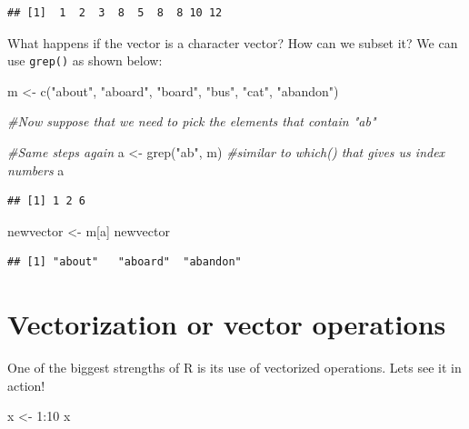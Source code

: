 \documentclass[
]{book}
\newenvironment{Shaded}{\begin{snugshade}}{\end{snugshade}}
\newcommand{\CommentTok}[1]{\textcolor[rgb]{0.56,0.35,0.01}{\textit{#1}}}
\newcommand{\DecValTok}[1]{\textcolor[rgb]{0.00,0.00,0.81}{#1}}
\newcommand{\FunctionTok}[1]{\textcolor[rgb]{0.00,0.00,0.00}{#1}}
\newcommand{\NormalTok}[1]{#1}
\newcommand{\OtherTok}[1]{\textcolor[rgb]{0.56,0.35,0.01}{#1}}
\newcommand{\SpecialCharTok}[1]{\textcolor[rgb]{0.00,0.00,0.00}{#1}}
\newcommand{\StringTok}[1]{\textcolor[rgb]{0.31,0.60,0.02}{#1}}
\theoremstyle{definition}
\theoremstyle{definition}
\theoremstyle{definition}
\theoremstyle{definition}
\theoremstyle{remark}
\begin{document}
\begin{verbatim}
## [1]  1  2  3  8  5  8  8 10 12
\end{verbatim}

What happens if the vector is a character vector? How can we subset it? We can use \texttt{grep()} as shown below:

\begin{Shaded}
\begin{Highlighting}[]
\NormalTok{m }\OtherTok{\textless{}{-}} \FunctionTok{c}\NormalTok{(}\StringTok{"about"}\NormalTok{, }\StringTok{"aboard"}\NormalTok{, }\StringTok{"board"}\NormalTok{, }\StringTok{"bus"}\NormalTok{, }\StringTok{"cat"}\NormalTok{, }\StringTok{"abandon"}\NormalTok{)}

\CommentTok{\#Now suppose that we need to pick the elements that contain "ab"}

\CommentTok{\#Same steps again}
\NormalTok{a }\OtherTok{\textless{}{-}} \FunctionTok{grep}\NormalTok{(}\StringTok{"ab"}\NormalTok{, m) }\CommentTok{\#similar to which() that gives us index numbers}
\NormalTok{a}
\end{Highlighting}
\end{Shaded}

\begin{verbatim}
## [1] 1 2 6
\end{verbatim}

\begin{Shaded}
\begin{Highlighting}[]
\NormalTok{newvector }\OtherTok{\textless{}{-}}\NormalTok{ m[a]}
\NormalTok{newvector}
\end{Highlighting}
\end{Shaded}

\begin{verbatim}
## [1] "about"   "aboard"  "abandon"
\end{verbatim}

\hypertarget{vectorization-or-vector-operations}{%
\section{Vectorization or vector operations}\label{vectorization-or-vector-operations}}

One of the biggest strengths of R is its use of vectorized operations. Lets see it in action!

\begin{Shaded}
\begin{Highlighting}[]
\NormalTok{x }\OtherTok{\textless{}{-}} \DecValTok{1}\SpecialCharTok{:}\DecValTok{10}
\NormalTok{x}
\end{Highlighting}
\end{Shaded}
\end{document}

